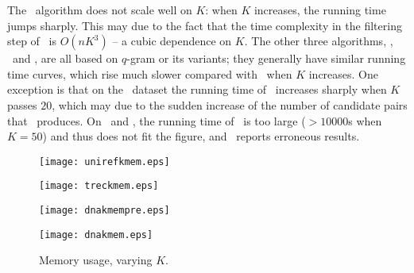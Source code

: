 The \pass\ algorithm does not scale well on $K$: when $K$ increases, the running time jumps sharply.  This may due to the fact that the time complexity in the filtering step of \pass\ is $O(n K^3)$ -- a cubic dependence on $K$.  The other three algorithms, \edjoin, \adpjoin\ and \qchunk, are all based on $q$-gram or its variants; they generally have similar running time curves, which rise much slower compared with \pass\ when $K$ increases.  One exception is that on the \uniref\ dataset the running time of \qchunk\ increases sharply when $K$ passes $20$, which may due to the sudden increase of the number of candidate pairs that \qchunk\ produces.  On \genoaa\ and \genoa, the running time of \edjoin\ is too large ($>10000$s when $K = 50$) and thus does not fit the figure, and \adpjoin\ reports erroneous results.



\begin{figure*}[t]
\centering
\begin{minipage}[d]{0.4\linewidth}
\centering
\texttt{[image: unirefkmem.eps]}
\centerline{\uniref}
\end{minipage}
\begin{minipage}[d]{0.4\linewidth}
\centering
\texttt{[image: treckmem.eps]}
\centerline{\trec}
\end{minipage}
\begin{minipage}[d]{0.4\linewidth}
\centering
\texttt{[image: dnakmempre.eps]}
\centerline{\genoaa}
\end{minipage}
\begin{minipage}[d]{0.4\linewidth}
\centering
\texttt{[image: dnakmem.eps]}
\centerline{\genoa}
\end{minipage}
\caption{Memory usage, varying $K$. 
}
\label{fig:kmem}
\end{figure*}


